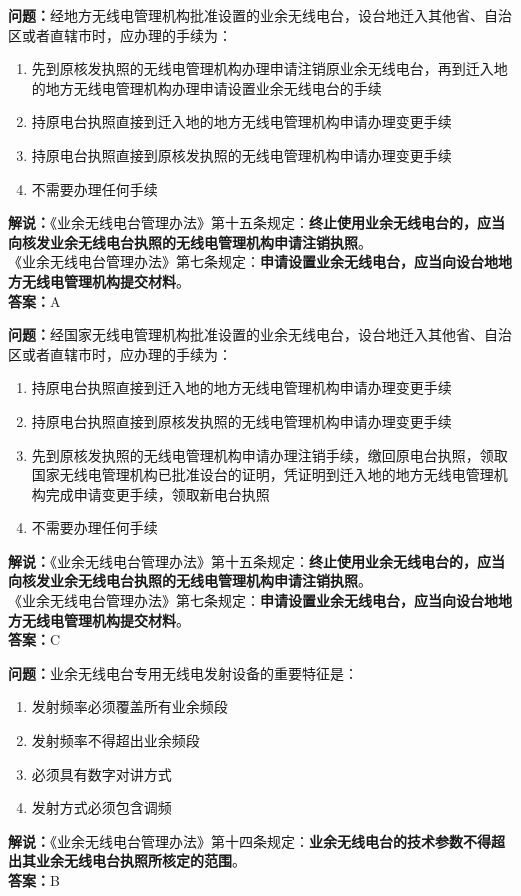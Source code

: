 \documentclass{ctexbook}
\begin{document}
\bigskip


\noindent\textbf{问题：}经地方无线电管理机构批准设置的业余无线电台，设台地迁入其他省、自治区或者直辖市时，应办理的手续为：
\begin{enumerate}[label=\Alph*), leftmargin=3em]
	\item 先到原核发执照的无线电管理机构办理申请注销原业余无线电台，再到迁入地的地方无线电管理机构办理申请设置业余无线电台的手续
	\item 持原电台执照直接到迁入地的地方无线电管理机构申请办理变更手续
	\item 持原电台执照直接到原核发执照的无线电管理机构申请办理变更手续
	\item 不需要办理任何手续
\end{enumerate}
\noindent\textbf{解说：}《业余无线电台管理办法》第十五条规定：\textbf{终止使用业余无线电台的，应当向核发业余无线电台执照的无线电管理机构申请注销执照}。\\
《业余无线电台管理办法》第七条规定：\textbf{申请设置业余无线电台，应当向设台地地方无线电管理机构提交材料}。\\\noindent\textbf{答案：}A%


\bigskip


\noindent\textbf{问题：}经国家无线电管理机构批准设置的业余无线电台，设台地迁入其他省、自治区或者直辖市时，应办理的手续为：
\begin{enumerate}[label=\Alph*), leftmargin=3em]
	\item 持原电台执照直接到迁入地的地方无线电管理机构申请办理变更手续
	\item 持原电台执照直接到原核发执照的无线电管理机构申请办理变更手续
	\item 先到原核发执照的无线电管理机构申请办理注销手续，缴回原电台执照，领取国家无线电管理机构已批准设台的证明，凭证明到迁入地的地方无线电管理机构完成申请变更手续，领取新电台执照
	\item 不需要办理任何手续
\end{enumerate}
\noindent\textbf{解说：}《业余无线电台管理办法》第十五条规定：\textbf{终止使用业余无线电台的，应当向核发业余无线电台执照的无线电管理机构申请注销执照}。\\
《业余无线电台管理办法》第七条规定：\textbf{申请设置业余无线电台，应当向设台地地方无线电管理机构提交材料}。\\\noindent\textbf{答案：}C%



\bigskip


\noindent\textbf{问题：}业余无线电台专用无线电发射设备的重要特征是：
\begin{enumerate}[label=\Alph*), leftmargin=3em]
	\item 发射频率必须覆盖所有业余频段
	\item 发射频率不得超出业余频段
	\item 必须具有数字对讲方式
	\item 发射方式必须包含调频
\end{enumerate}
\noindent\textbf{解说：}《业余无线电台管理办法》第十四条规定：\textbf{业余无线电台的技术参数不得超出其业余无线电台执照所核定的范围}。\\\noindent\textbf{答案：}B%
\end{document}
